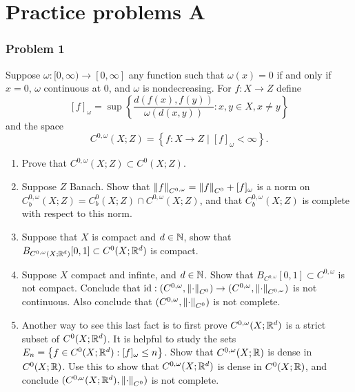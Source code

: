 \documentclass[a4paper]{article}
\begin{document}
\section*{Practice problems A}
\subsubsection*{Problem 1}
Suppose $\omega: [0, \infty) \to [0, \infty]$ any function
such that $\omega(x) = 0$ if and only if $x = 0$,
$\omega$ continuous at
$0$, and $\omega$ is nondecreasing. For $f: X \to Z$ define
\[
  [f]_\omega = \sup\left\{ \frac{d(f(x),f(y))}{\omega(d(x,y))} :
  x, y \in X, x \neq y \right\}
\]
and the space
\[
  C^{0, \omega} (X; Z) = \left\{ f: X \to Z \mid [f]_\omega < \infty \right\}.
\]
{
  \newcommand{\cw}{{C^{0, \omega}}}
  \newcommand{\cwb}{{C^{0, \omega}_b}}
  \begin{enumerate}
    \item Prove that $\cw(X; Z) \subset C^0(X; Z)$.

    \item Suppose $Z$ Banach. Show that $\norm{f}_{\cw} = \norm{f}_{C^0} + [f]_\omega$
          is a norm on $\cwb(X; Z) = C^0_b(X; Z) \cap \cw(X; Z)$, and
          that $\cwb(X;Z)$ is complete with respect to this norm.

    \item Suppose that $X$ is compact and $d \in \mathbb{N}$, show that
          $B_{C^{0, \omega}(X; \mathbb{R}^d)} [0, 1] \subset C^0(X; \mathbb{R}^d)$
          is compact.

    \item Suppose $X$ compact and infinte, and $d \in \mathbb{N}$.
          Show that $B_{\cw}[0,1] \subset \cw$ is not compact.
          Conclude that $\id: (\cw, \norm{\cdot}_{C^0}) \to (\cw, \norm{\cdot}_{\cw})$
          is not continuous. Also conclude that $(\cw, \norm{\cdot}_{C^0})$
          is not complete.

    \item Another way to see this last fact is to first prove
          $\cw(X; \R^d)$ is a strict subset of $C^0(X; \mathbb{R}^d)$. It is helpful
          to study the sets $E_n = \left\{ f \in C^0(X; \mathbb{R}^d) : [f]_\omega \leq n \right\}$.
          Show that $\cw(X; \R)$ is dense in $C^0(X; \mathbb{R})$.
          Use this to show that $\cw(X; \R^d)$ is dense in $C^0(X; \mathbb{R})$,
          and conclude $(\cw(X; \R^d), \norm{\cdot}_{C^0})$
          is not complete.
  \end{enumerate}


}
\end{document}
